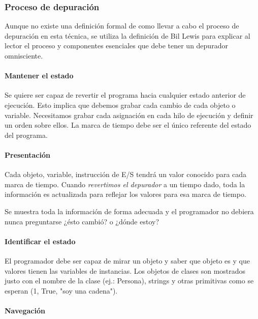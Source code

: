 \documentclass[12pt,legalpaper]{report}
\begin{document}
			\subsubsection{Proceso de depuración}

Aunque no existe una definición formal de como llevar a cabo el proceso de depuración en esta técnica, se utiliza la definición de Bil Lewis \cite{odb} para explicar al lector el proceso y componentes esenciales que debe tener un depurador omnisciente.

				\paragraph{Mantener el estado}

Se quiere ser capaz de revertir el programa hacia cualquier estado anterior de ejecución.  Esto implica que debemos grabar cada cambio de cada objeto o variable.  Necesitamos grabar cada asignación en cada hilo de ejecución y definir un orden sobre ellos.  La marca de tiempo debe ser el único referente del estado del programa.

				\paragraph{Presentación}

Cada objeto, variable, instrucción de E/S tendrá un valor conocido para cada marca de tiempo.  Cuando \textit{revertimos el depurador} a un tiempo dado, toda la información es actualizada para reflejar los valores para esa marca de tiempo.

Se muestra toda la información de forma adecuada y el programador no debiera nunca preguntarse ¿ésto cambió? o ¿dónde estoy?

				\paragraph{Identificar el estado}

El programador debe ser capaz de mirar un objeto y saber que objeto es y que valores tienen las variables de instancias.  Los objetos de clases son mostrados justo con el nombre de la clase (ej.: Persona), strings y otras primitivas como se esperan (1, True, "soy una cadena").

				\paragraph{Navegación}
\end{document}
